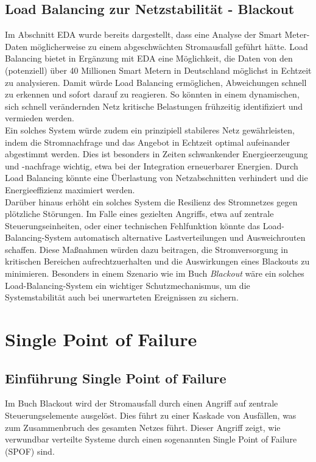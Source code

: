 \documentclass[a4paper,12pt]{article}
\let\stdsection\section
\renewcommand\section{\newpage\stdsection}
\begin{document}
\subsection{Load Balancing zur Netzstabilität - Blackout}
Im Abschnitt EDA wurde bereits dargestellt, dass eine Analyse der Smart Meter-Daten möglicherweise zu einem abgeschwächten Stromausfall geführt hätte. Load Balancing bietet in Ergänzung mit EDA eine Möglichkeit, die Daten von den (potenziell) über 40 Millionen \cite{Haushalte} Smart Metern in Deutschland möglichst in Echtzeit zu analysieren. Damit würde Load Balancing ermöglichen, Abweichungen schnell zu erkennen und sofort darauf zu reagieren. So könnten in einem dynamischen, sich schnell verändernden Netz kritische Belastungen frühzeitig identifiziert und vermieden werden.\\
Ein solches System würde zudem ein prinzipiell stabileres Netz gewährleisten, indem die Stromnachfrage und das Angebot in Echtzeit optimal aufeinander abgestimmt werden. Dies ist besonders in Zeiten schwankender Energieerzeugung und -nachfrage wichtig, etwa bei der Integration erneuerbarer Energien. Durch Load Balancing könnte eine Überlastung von Netzabschnitten verhindert und die Energieeffizienz maximiert werden.\\
Darüber hinaus erhöht ein solches System die Resilienz des Stromnetzes gegen plötzliche Störungen. Im Falle eines gezielten Angriffs, etwa auf zentrale Steuerungseinheiten, oder einer technischen Fehlfunktion könnte das Load-Balancing-System automatisch alternative Lastverteilungen und Ausweichrouten schaffen. Diese Maßnahmen würden dazu beitragen, die Stromversorgung in kritischen Bereichen aufrechtzuerhalten und die Auswirkungen eines Blackouts zu minimieren. Besonders in einem Szenario wie im Buch \textit{Blackout} wäre ein solches Load-Balancing-System ein wichtiger Schutzmechanismus, um die Systemstabilität auch bei unerwarteten Ereignissen zu sichern.

\section{Single Point of Failure}

\subsection{Einführung Single Point of Failure}

Im Buch Blackout wird der Stromausfall durch einen Angriff auf zentrale Steuerungselemente ausgelöst. Dies führt zu einer Kaskade von Ausfällen, was zum Zusammenbruch des gesamten Netzes führt. Dieser Angriff zeigt, wie verwundbar verteilte Systeme durch einen sogenannten Single Point of Failure (SPOF) sind.
\end{document}
